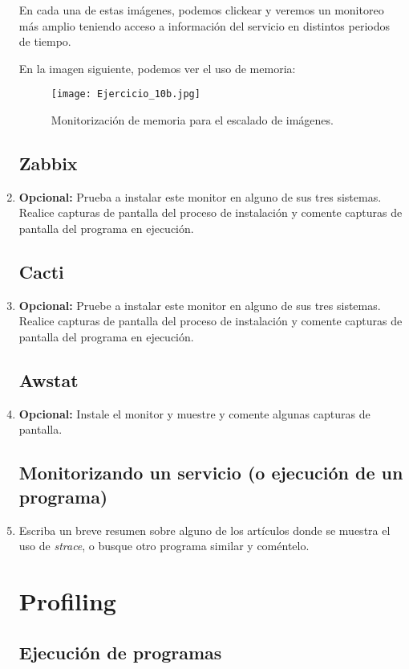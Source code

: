 \documentclass[paper=a4, fontsize=11pt]{scrartcl} %
\numberwithin{equation}{section} %
\numberwithin{figure}{section} %
\numberwithin{table}{section} %
\begin{document}
\begin{enumerate}
		En cada una de estas imágenes, podemos clickear y veremos un monitoreo más amplio teniendo
		acceso a información del servicio en distintos periodos de tiempo.
		
		En la imagen siguiente, podemos ver el uso de memoria\cite{ganglia_WM_2}:
		
		\begin{figure}[H]
			\centering
			\texttt{[image: Ejercicio\_10b.jpg]}
			\caption{Monitorización de memoria para el escalado de imágenes.}
			\label{fig:Ganglia_memoria}
		\end{figure}
		
		
	\subsection{Zabbix}
		\item \textbf{Opcional:} Prueba a instalar este monitor en alguno de sus tres sistemas.
		Realice capturas de pantalla del proceso de instalación y comente capturas de pantalla
		del programa en ejecución.
		
	\subsection{Cacti}
		\item \textbf{Opcional:} Pruebe a instalar este monitor en alguno de sus tres sistemas.
		Realice capturas de pantalla del proceso de instalación y comente capturas de pantalla
		del programa en ejecución.
		
	\subsection{Awstat}
		\item \textbf{Opcional:} Instale el monitor y muestre y comente algunas capturas de pantalla.
		
	\subsection{Monitorizando un servicio (o ejecución de un programa)}
		\item Escriba un breve resumen sobre alguno de los artículos donde se muestra el uso de
		\textit{strace}, o busque otro programa similar y coméntelo.
		
	\section{Profiling}
	\subsection{Ejecución de programas}

\end{enumerate}
\end{document}
